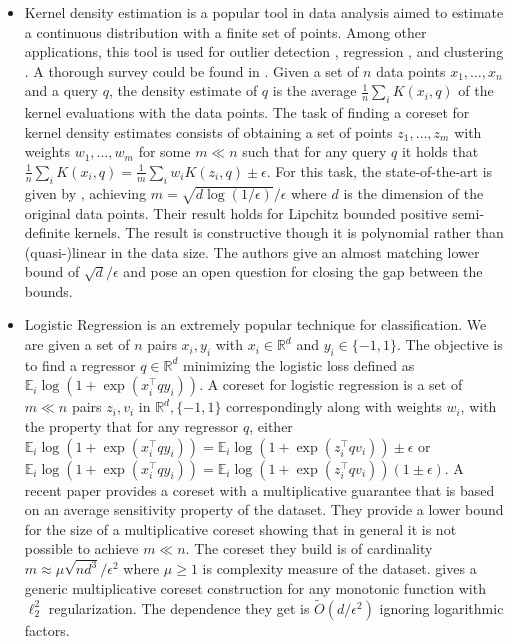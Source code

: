 \documentclass[anon,12pt]{colt2019} %
\newcommand{\R}{\mathbb{R}}
\newcommand{\E}{\mathbb{E}}
\newcommand{\eps}{\epsilon}
\begin{document}
\begin{itemize}
\item Kernel density estimation is a popular tool in data analysis aimed to estimate a continuous distribution with a finite set of points. Among other applications, this tool is used for outlier detection \cite{schubert2014generalized}, regression \cite{fan2018local}, and clustering \cite{rinaldo2010generalized}. A thorough survey could be found in \cite{silverman2018density}. Given a set of $n$ data points $x_1,\ldots,x_n$ and a query $q$, the density estimate of $q$ is the average $\frac{1}{n} \sum_i K(x_i,q)$ of the kernel evaluations with the data points. The task of finding a coreset for kernel density estimates consists of obtaining a set of points $z_1,\ldots,z_m$ with weights $w_1,\ldots,w_m$ for some $m \ll n$ such that for any query $q$ it holds that 
$\frac{1}{n} \sum_i K(x_i,q) = \frac{1}{m} \sum_i w_i K(z_i,q) \pm \eps$. For this task, the state-of-the-art is given by \cite{DBLP:journals/corr/abs-1802-01751}, achieving $m=\sqrt{d\log(1/\eps)}/\eps$ where $d$ is the dimension of the original data points. Their result holds for Lipchitz bounded positive semi-definite kernels. The result is constructive though it is polynomial rather than (quasi-)linear in the data size. The authors give an almost matching lower bound of $\sqrt{d}/\eps$ and pose an open question for closing the gap between the bounds.

\item Logistic Regression is an extremely popular technique for classification. We are given a set of $n$ pairs $x_i,y_i$ with $x_i \in \R^d$ and $y_i \in \{-1,1\}$. The objective is to find a regressor $q \in \R^d$ minimizing the logistic loss defined as $\E_i \log(1+\exp(x_i^\top q y_i))$. A coreset for logistic regression is a set of $m \ll n$ pairs $z_i, v_i$ in $\R^d, \{-1,1\}$ correspondingly along with weights $w_i$, with the property that for any regressor $q$, either $\E_i \log(1+\exp(x_i^\top q y_i)) = \E_i \log(1+\exp(z_i^\top q v_i)) \pm \eps$ or $\E_i \log(1+\exp(x_i^\top q y_i)) = \E_i \log(1+\exp(z_i^\top q v_i)) (1 \pm \eps)$. A recent paper \cite{DBLP:journals/corr/abs-1805-08571} provides a coreset with a multiplicative guarantee that is based on an average sensitivity property of the dataset. They provide a lower bound for the size of a multiplicative coreset showing that in general it is not possible to achieve $m \ll n$. The coreset they build is of cardinality $m \approx \mu\sqrt{nd^3}/\eps^2$ where $\mu \geq 1$ is complexity measure of the dataset.  \cite{tolochinsky2018coresets} gives a generic multiplicative coreset construction for any monotonic function with $\ell_2^2$ regularization. The dependence they get is $\tilde O(d/\eps^2)$ ignoring logarithmic factors.  


\end{itemize}
\end{document}

